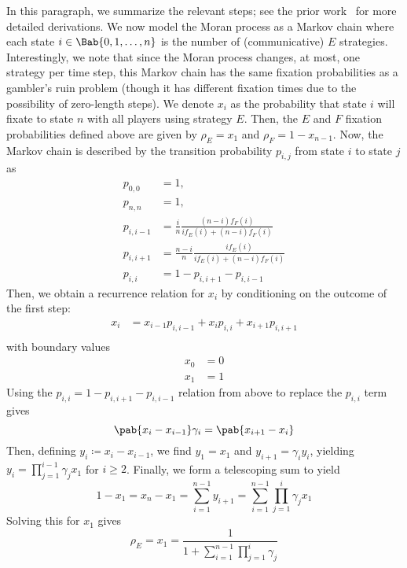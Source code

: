 In this paragraph, we summarize the relevant steps;
see the prior work~\citep{tripp2022evolutionary}
for more detailed derivations.
We now model the Moran process
as a Markov chain where each state $i \in \Bab{0,1,\ldots,n}$
is the number of (communicative) $E$ strategies.
Interestingly, we note that since the Moran process changes, at most,
one strategy per time step,
this Markov chain has the same fixation probabilities as a gambler's ruin problem
(though it has different fixation times due to the possibility of zero-length steps).
We denote $x_i$ as the probability that state $i$ will fixate
to state $n$ with all players using strategy $E$.
Then, the $E$ and $F$ fixation probabilities defined above are given by
$\rho_E = x_1$ and $\rho_F = 1 - x_{n-1}$.
Now, the Markov chain is described by the transition probability $p_{i,j}$
from state $i$ to state $j$ as
\begin{align*}
  p_{0,0} &= 1, \\
  p_{n,n} &= 1, \\
  p_{i,i-1} &= \frac{i}{n} \frac{(n-i) f_F(i)}{i f_E(i) + (n-i) f_F(i)} \\
  p_{i,i+1} &= \frac{n-i}{n} \frac{i f_E(i)}{i f_E(i) + (n-i) f_F(i)} \\
  p_{i,i} &= 1 - p_{i,i+1} - p_{i,i-1}
\end{align*}
Then, we obtain a recurrence relation for $x_i$ by conditioning
on the outcome of the first step:
\begin{align*}
  x_i &= x_{i-1} p_{i,i-1} + x_i p_{i,i} + x_{i+1} p_{i,i+1} \\
\end{align*}
with boundary values
\begin{align*}
  x_0 &= 0 \\
  x_1 &= 1
\end{align*}
Using the $p_{i,i} = 1 - p_{i,i+1} - p_{i,i-1}$ relation from above
to replace the $p_{i,i}$ term gives
\begin{equation*}
  \pab{x_i - x_{i-1}} \gamma_i = \pab{x_{i+1} - x_i}
\end{equation*}
Then, defining $y_i \coloneqq x_i - x_{i-1}$,
we find $y_1 = x_1$ and $y_{i+1} = \gamma_i y_i$,
yielding $y_i = \prod_{j=1}^{i-1} \gamma_j x_1$ for $i \ge 2$.
Finally, we form a telescoping sum to yield
\begin{equation*}
  1 - x_1 = x_n - x_1
  = \sum_{i=1}^{n-1} y_{i+1}
  = \sum_{i=1}^{n-1} \prod_{j=1}^i \gamma_j x_1
\end{equation*}
Solving this for $x_1$ gives
\begin{equation}
  \rho_E = x_1 = \frac{1}{1 + \sum_{i=1}^{n-1} \prod_{j=1}^i \gamma_j}
  \label{eq:comm_fixation_prob}
\end{equation}
